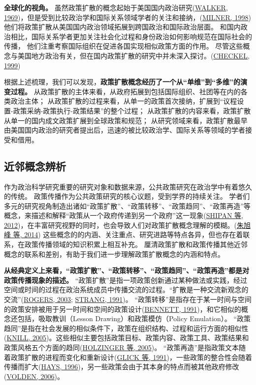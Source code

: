\documentclass[
  12pt,
]{ctexart}
\begin{document}
\textbf{全球化的视角。}
虽然政策扩散的概念起始于美国国内政治研究(\protect\hyperlink{ref-Walker1969}{WALKER, 1969})，但是受到比较政治学和国际关系领域学者的关注和接纳，(\protect\hyperlink{ref-Milner1998}{MILNER, 1998})他们将政策扩散从美国国内政治领域拓展到跨国政治和国际政治层面。
和国内政治相比，国际关系学者更加关注社会化过程和身份政治如何影响规范在国际社会的传播，
他们注重考察国际组织在促进各国实现相似政策方面的作用。
尽管这些概念与美国地方政治有关，但在国内政策扩散的研究中并未深入探讨。(\protect\hyperlink{ref-Checkel1999}{CHECKEL, 1999})

根据上述梳理，我们可以发现，\textbf{政策扩散概念经历了一个从``单维''到``多维''的演变过程。}
从政策扩散的主体来看，从政府拓展到包括国际组织、社团等在内的各类政治主体；
从政策扩散的过程来看，从单一的政策首次接纳，扩展到``议程设置-政策采纳-政策执行-政策结果''的整个过程；
从政策扩散的内容来看，政策扩散从单一的国内成文政策扩展到全球政策和规范；
从研究领域来看，政策扩散最早由美国国内政治的研究者提出后，迅速的被比较政治学、国际关系等领域的学者接受和借用。

\hypertarget{ux8fd1ux90bbux6982ux5ff5ux8fa8ux6790}{%
\subsection{近邻概念辨析}\label{ux8fd1ux90bbux6982ux5ff5ux8fa8ux6790}}

作为政治科学研究重要的研究对象和数据来源，公共政策研究在政治学中有着悠久的传统。
政策传播作为公共政策研究的核心议题，受到学界的持续关注。
学者们多元的研究视角制造出诸如``政策扩散''、``政策转移''、``政策趋同''、``政策再造''等概念，来描述和解释``政策从一个政府传递到另一个政府''这一现象(\protect\hyperlink{ref-ShipanVolden2012}{SHIPAN 等, 2012})，在丰富研究视野的同时，也会导致人们对政策扩散概念理解的模糊。(\protect\hyperlink{ref-ZhuXuFengZhangYouLang2014}{朱旭峰 等, 2014})
这些概念的的内涵、关注重点、研究进路等特点各异，但也存在着联系，在政策传播领域的知识积累上相互补充。
厘清政策扩散和政策传播其他近邻概念的联系和差别，有助于我们进一步理解政策扩散概念的内涵和特点。

\textbf{从经典定义上来看，``政策扩散''、``政策转移''、``政策趋同''、``政策再造''都是对政策传播现象的描述。}
``政策扩散''是指一项政策创新通过某种做法或实践，经过空间或时间的过程在政治系统成员中传播交流的过程。``扩散是一种交流新观念的交流''(\protect\hyperlink{ref-Rogers2003}{ROGERS, 2003}; \protect\hyperlink{ref-STRANG1991}{STRANG, 1991})。
``政策转移''是指存在于某一时间与空间的政策安排被用于另一时间和空间的政策设计(\protect\hyperlink{ref-Bennett1991}{BENNETT, 1991})，和它相似的概念还包括，吸取教训（Lesson Drawing）和政策模仿（Policy Emulation）。
``政策趋同''是指在社会发展的相似条件下，政策在组织结构、过程和运行方面的相似性(\protect\hyperlink{ref-Knill2005}{KNILL, 2005})。这些相似主要包括政策目标、政策内容、政策工具、政策结果和政策风格五个方面的趋同(\protect\hyperlink{ref-HolzingerKnill2005}{HOLZINGER 等, 2005})。
``政策再造''是指政策文本随着政策扩散的进程而变化和重新设计(\protect\hyperlink{ref-GlickHays1991}{GLICK 等, 1991})，一些政策的整合性会随着传播而扩大(\protect\hyperlink{ref-Hays1996}{HAYS, 1996})，另一些政策会由于其本身的特点而被其他政府修改(\protect\hyperlink{ref-Volden2006}{VOLDEN, 2006})。
\end{document}
